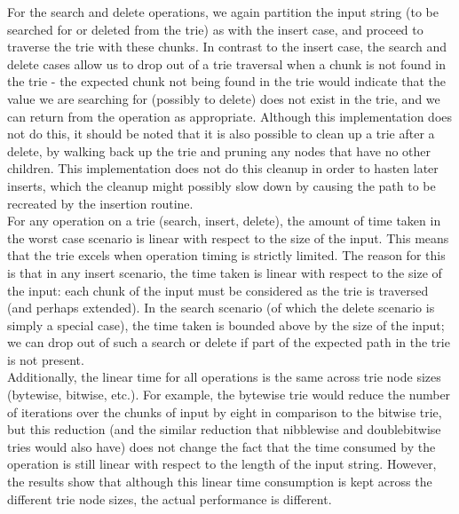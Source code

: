 \documentclass{llncs}
\begin{document}
For the search and delete operations, we again partition the input string (to be searched for or deleted from the trie) as with the insert case, and proceed to traverse the trie with these chunks. In contrast to the insert case, the search and delete cases allow us to drop out of a trie traversal when a chunk is not found in the trie - the expected chunk not being found in the trie would indicate that the value we are searching for (possibly to delete) does not exist in the trie, and we can return from the operation as appropriate. Although this implementation does not do this, it should be noted that it is also possible to clean up a trie after a delete, by walking back up the trie and pruning any nodes that have no other children. This implementation does not do this cleanup in order to hasten later inserts, which the cleanup might possibly slow down by causing the path to be recreated by the insertion routine.\\
For any operation on a trie (search, insert, delete), the amount of time taken in the worst case scenario is linear with respect to the size of the input. This means that the trie excels when operation timing is strictly limited. The reason for this is that in any insert scenario, the time taken is linear with respect to the size of the input: each chunk of the input must be considered as the trie is traversed (and perhaps extended). In the search scenario (of which the delete scenario is simply a special case), the time taken is bounded above by the size of the input; we can drop out of such a search or delete if part of the expected path in the trie is not present. \\
Additionally, the linear time for all operations is the same across trie node sizes (bytewise, bitwise, etc.). For example, the bytewise trie would reduce the number of iterations over the chunks of input by eight in comparison to the bitwise trie, but this reduction (and the similar reduction that nibblewise and doublebitwise tries would also have) does not change the fact that the time consumed by the operation is still linear with respect to the length of the input string. However, the results show that although this linear time consumption is kept across the different trie node sizes, the actual performance is different.\\
\newpage
\end{document}
